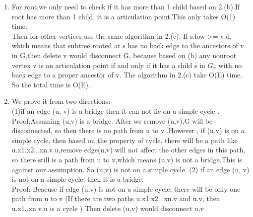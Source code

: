 \documentclass[paper=a4, fontsize=11pt]{scrartcl} %
\numberwithin{equation}{section} %
\numberwithin{figure}{section} %
\numberwithin{table}{section} %
\begin{document}
\begin{enumerate}[label={2.(\alph*)}]
  \item 
For root,we only need to check if it has more than 1 child based on 2.(b).If root has more than 1 child, it is a articulation point.This only takes O(1) time.\\
Then for other vertices  use the same algorithm in 2.(c). If s.low >= v.d, which means that subtree rooted at s has no back edge to  the ancestors of v in G,then delete v would disconnect G, because based on (b)  any nonroot vertex v is an articulation point if and only if it has a child s in  ${G_\pi}$ with no back edge to a proper ancestor of v. The algorithm in 2.(c) take O(E) time.
So the total time is O(E).

  \item 
We prove it from two directions:\\
(1)if an edge (u, v) is a bridge then it can not lie on a simple cycle .\\
Proof:Assuming (u,v) is a bridge. After we  remove (u,v),G  will be disconnected, so  then there is no path from u to v .However , if (u,v) is on a simple cycle, then based on the property of cycle, there will be a path like u.x1.x2...xn.v.u,remove edge(u,v) will not affect the other edges in this path, so there still is a path from u to v,which means (u,v) is not a bridge.This is against our assumption. So (u,v) is not on a simple cycle.  
(2) if an edge (u, v) is not on a simple cycle, then it is a bridge.\\
Proof: Beacuse if edge (u,v) is not on a simple cycle, there will be only one path from u to v (If there are two paths u.x1.x2...xn.v and  u.v, then u.x1..xn.v.u is a cycle ) Then delete (u,v) would disconnect u,v 



\end{enumerate}
\end{document}

